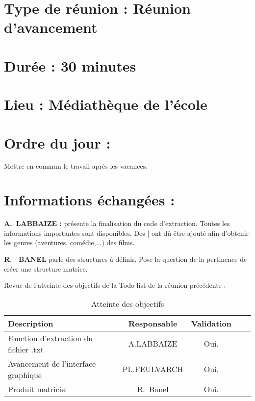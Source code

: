 \documentclass[11pt]{meetingmins}
\begin{document}
\maketitle
\section{Type de réunion : \textnormal{Réunion d'avancement} }

\section{Durée : \textnormal{30 minutes} }
\section{Lieu : \textnormal{Médiathèque de l'école} }


\section{}
\section{Ordre du jour :}
\begin{hiddenitems}

Mettre en commun le travail après les vacances.
\end{hiddenitems}



\section{Informations échangées :}
\begin{hiddenitems}
\item
\textbf{A.~LABBAIZE : } présente la finalisation du code d'extraction. Toutes les informations importantes sont disponibles. Des | ont dû être ajouté afin d'obtenir les genres (aventures, comédie,...) des films.

\item
\textbf{R. ~BANEL} parle des structures à définir. Pose la question de la pertinence de créer une structure matrice. 


\item Revue de l'atteinte des objectifs de la Todo list de la réunion précédente :
\begin{table}[h]
    \centering
    \begin{tabular}{|p{4cm}|c|c|c|c|}
    \hline
        \rowcolor{yellow} Description & Responsable & Validation
        \tabularnewline \hline
        Fonction d'extraction du fichier .txt &  A.LABBAIZE & Oui.
        \tabularnewline \hline
        Avancement de l'interface graphique & PL.FEULVARCH & Oui.
        \tabularnewline \hline
        Produit matriciel  & R.~Banel & Oui. \tabularnewline \hline 

        
    \end{tabular}
    \caption{Atteinte des objectifs}
    \label{tab:my_label}
\end{table}

\end{hiddenitems}
\end{document}
